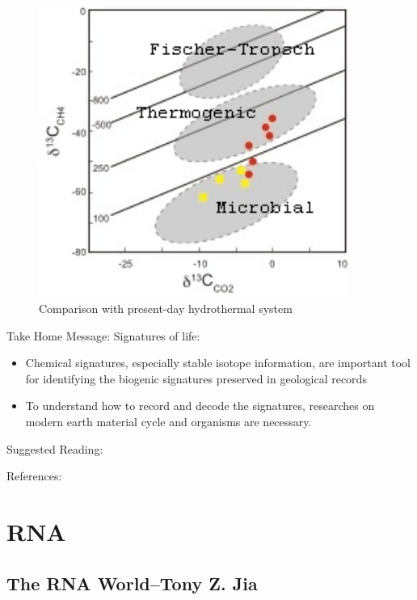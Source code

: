 \documentclass[]{article}
\begin{document}
\begin{figure}[H]
	\caption{Comparison with present-day hydrothermal system}\label{fig:ueno_comparison}
	\includegraphics[width=0.9\textwidth]{ueno_comparison}
\end{figure}

Take Home Message: Signatures of life:
\begin{itemize}
	\item Chemical signatures, especially stable isotope information, are important tool for identifying the biogenic signatures preserved in geological records
	\item To understand how to record and decode the signatures, researches on modern earth material cycle and organisms are 	necessary.
\end{itemize}

Suggested Reading:

\cite{sharp2017principles,allegre2008isotope}

References:
\cite{ueno2006evidence,bell2015potentially,rosing199913c,shen2001isotopic,summons19992,han1992megascopic}

\section{RNA}

\subsection[The RNA World]{The RNA World--Tony Z. Jia}
\end{document}
